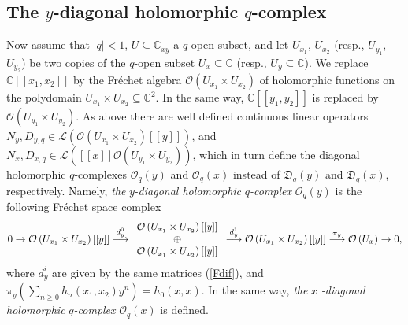 \documentclass[12pt,reqno]{amsart}%
\theoremstyle{plain}
\numberwithin{theorem}{section} \numberwithin{equation}{section}
\numberwithin{lemma}{section}
\numberwithin{remark}{section}
\numberwithin{example}{section}
\numberwithin{proposition}{section}
\numberwithin{definition}{section}
\numberwithin{corollary}{section}
\begin{document}
\subsection{The $y$-diagonal holomorphic $q$-complex\label{subsecDHC}}

Now assume that $\left\vert q\right\vert <1$, $U\subseteq\mathbb{C}_{xy}$ a
$q$-open subset, and let $U_{x_{1}}$, $U_{x_{2}}$ (resp., $U_{y_{1}}$,
$U_{y_{2}}$) be two copies of the $q$-open subset $U_{x}\subseteq\mathbb{C}$
(resp., $U_{y}\subseteq\mathbb{C}$). We replace $\mathbb{C}\left[  \left[
x_{1},x_{2}\right]  \right]  $ by the Fr\'{e}chet algebra $\mathcal{O}\left(
U_{x_{1}}\times U_{x_{2}}\right)  $ of holomorphic functions on the polydomain
$U_{x_{1}}\times U_{x_{2}}\subseteq\mathbb{C}^{2}$. In the same way,
$\mathbb{C}\left[  \left[  y_{1},y_{2}\right]  \right]  $ is replaced by
$\mathcal{O}\left(  U_{y_{1}}\times U_{y_{2}}\right)  $. As above there are
well defined continuous linear operators $N_{y},D_{y,q}\in\mathcal{L}\left(
\mathcal{O}\left(  U_{x_{1}}\times U_{x_{2}}\right)  \left[  \left[  y\right]
\right]  \right)  $, and $N_{x},D_{x,q}\in\mathcal{L}\left(  \left[  \left[
x\right]  \right]  \mathcal{O}\left(  U_{y_{1}}\times U_{y_{2}}\right)
\right)  $, which in turn define the diagonal holomorphic $q$-complexes
$\mathcal{O}_{q}\left(  y\right)  $ and $\mathcal{O}_{q}\left(  x\right)  $
instead of $\mathfrak{D}_{q}\left(  y\right)  $ and $\mathfrak{D}_{q}\left(
x\right)  $, respectively. Namely,\textit{ the }$y$-\textit{diagonal
holomorphic }$q$\textit{-complex} $\mathcal{O}_{q}\left(  y\right)  $ is the
following Fr\'{e}chet space complex
\[
0\rightarrow\mathcal{O}\left(  U_{x_{1}}\times U_{x_{2}}\right)  \left[
\left[  y\right]  \right]  \overset{d_{y}^{0}}{\longrightarrow}%
\begin{array}
[c]{c}%
\mathcal{O}\left(  U_{x_{1}}\times U_{x_{2}}\right)  \left[  \left[  y\right]
\right] \\
\oplus\\
\mathcal{O}\left(  U_{x_{1}}\times U_{x_{2}}\right)  \left[  \left[  y\right]
\right]
\end{array}
\overset{d_{y}^{1}}{\longrightarrow}\mathcal{O}\left(  U_{x_{1}}\times
U_{x_{2}}\right)  \left[  \left[  y\right]  \right]  \overset{\pi
_{y}}{\longrightarrow}\mathcal{O}\left(  U_{x}\right)  \rightarrow0,
\]
where $d_{y}^{i}$ are given by the same matrices (\ref{Fdif}), and $\pi
_{y}\left(  \sum_{n\geq0}h_{n}\left(  x_{1},x_{2}\right)  y^{n}\right)
=h_{0}\left(  x,x\right)  $. In the same way, \textit{the }$x$%
\textit{-diagonal holomorphic }$q$\textit{-complex }$\mathcal{O}_{q}\left(
x\right)  $ is defined.
\end{document}
